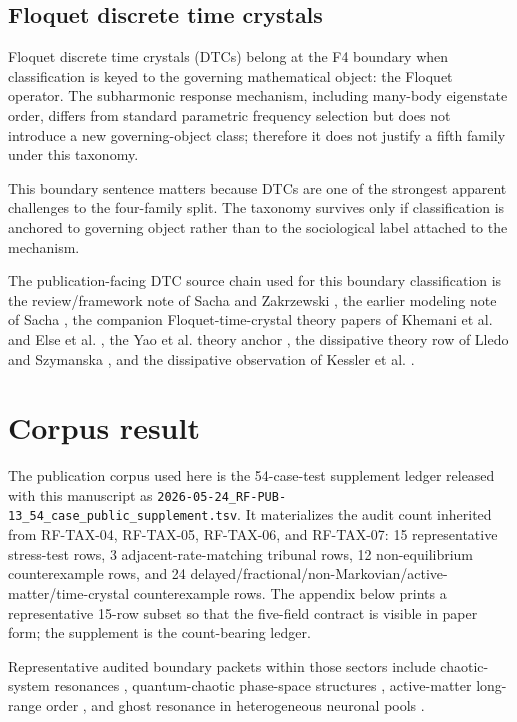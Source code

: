 \documentclass[aps,pra,reprint,nofootinbib]{revtex4-2}
\begin{document}
\subsection{Floquet discrete time crystals}

Floquet discrete time crystals (DTCs) belong at the F4 boundary when classification is keyed to the governing mathematical object: the Floquet operator. The subharmonic response mechanism, including many-body eigenstate order, differs from standard parametric frequency selection but does not introduce a new governing-object class; therefore it does not justify a fifth family under this taxonomy.

This boundary sentence matters because DTCs are one of the strongest apparent challenges to the four-family split. The taxonomy survives only if classification is anchored to governing object rather than to the sociological label attached to the mechanism.

The publication-facing DTC source chain used for this boundary classification is the review/framework note of Sacha and Zakrzewski \cite{sacha2018review}, the earlier modeling note of Sacha \cite{sacha2015modeling}, the companion Floquet-time-crystal theory papers of Khemani et al. \cite{khemani2016phase} and Else et al. \cite{else2016floquet}, the Yao et al. theory anchor \cite{yao2017discrete}, the dissipative theory row of Lledo and Szymanska \cite{lledo2020dissipative}, and the dissipative observation of Kessler et al. \cite{kessler2021observation}.

\section{Corpus result}

The publication corpus used here is the 54-case-test supplement ledger released with this manuscript as \texttt{2026-05-24\_RF-PUB-13\_54\_case\_public\_supplement.tsv}. It materializes the audit count inherited from RF-TAX-04, RF-TAX-05, RF-TAX-06, and RF-TAX-07: 15 representative stress-test rows, 3 adjacent-rate-matching tribunal rows, 12 non-equilibrium counterexample rows, and 24 delayed/fractional/non-Markovian/active-matter/time-crystal counterexample rows. The appendix below prints a representative 15-row subset so that the five-field contract is visible in paper form; the supplement is the count-bearing ledger.

Representative audited boundary packets within those sectors include chaotic-system resonances \cite{ruelle1986resonances}, quantum-chaotic phase-space structures \cite{bohigas1993manifestations}, active-matter long-range order \cite{toner1995long}, and ghost resonance in heterogeneous neuronal pools \cite{balenzuela2007ghost}.
\end{document}
